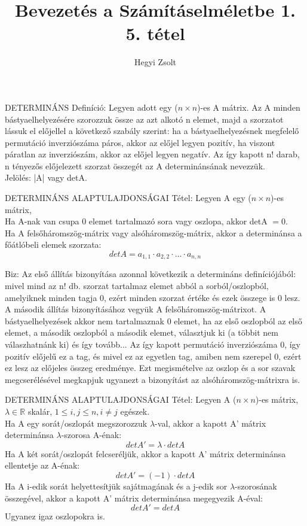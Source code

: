 \documentclass[]{article}
\title{Bevezetés a Számításelméletbe 1.\\{\large 5. tétel}}
\author{Hegyi Zsolt}
\newcommand{\R}{\mathbb{R}}
\begin{document}
\maketitle{}
\begin{shaded}
DETERMINÁNS Definíció: Legyen adott egy ($n \times n$)-es A mátrix. Az A minden bástyaelhelyezésére
szorozzuk össze az azt alkotó n elemet, majd a szorzatot lássuk el előjellel
a következő szabály szerint: ha a bástyaelhelyezésnek megfelelő permutáció inverziószáma
páros, akkor az előjel legyen pozitív, ha viszont páratlan az inverziószám,
akkor az előjel legyen negatív. Az így kapott n! darab, n tényezős előjelezett szorzat
összegét az A determinánsának nevezzük. \\
Jelölés: |A| vagy detA.
\end{shaded}
\begin{framed}
DETERMINÁNS ALAPTULAJDONSÁGAI Tétel: Legyen A egy ($n \times n$)-es mátrix,\\
Ha A-nak van csupa 0 elemet tartalmazó sora vagy oszlopa, akkor detA $= 0$.\\
Ha A felsőháromszög-mátrix vagy alsóháromszög-mátrix, akkor a determinánsa a főátlóbeli elemek szorzata: $$det A = a_{1,1}\cdot a_{2,2}\cdot \ldots\cdot a_{n,n}$$
\end{framed}
\begin{leftbar}
Biz: Az első állítás bizonyítása azonnal következik a determináns definíciójából: mivel mind az n! db. szorzat tartalmaz elemet abból a sorból/oszlopból, amelyiknek minden tagja 0, ezért minden szorzat értéke és ezek összege is 0 lesz.\\
A második állítás bizonyításához vegyük A felsőháromszög-mátrixot. A bástyaelhelyezések akkor nem tartalmaznak 0 elemet, ha az első oszlopból az első elemet, a második oszlopból a második elemet, választjuk ki (a többit nem válaszhatnánk ki) és így tovább... Az így kapott permutáció inverziószáma 0, így pozitív előjelű ez a tag, és mivel ez az egyetlen tag, amiben nem szerepel 0, ezért ez lesz az előjeles összeg eredménye. Ezt megismételve az oszlop és a sor szavak megcserélésével megkapjuk ugyanezt a bizonyítást az alsóháromszög-mátrixra is.
\end{leftbar}
\begin{framed}
DETERMINÁNS ALAPTULAJDONSÁGAI Tétel: Legyen A ($n\times n$)-es mátrix, $\lambda \in \R$ skalár, $1 \leq i,j\leq n, i \neq j$ egészek.\\
Ha A egy sorát/oszlopát megszorozzuk $\lambda$-val, akkor a kapott A' mátrix determinánsa $\lambda$-szorosa A-énak:$$detA' = \lambda\cdot detA$$
Ha A két sorát/oszlopát felcseréljük, akkor a kapott A' mátrix determinánsa ellentetje az A-énak:
$$detA' = (-1)\cdot detA$$
Ha A i-edik sorát helyettesítjük sajátmagának és a j-edik sor $\lambda$-szorosának összegével, akkor a kapott A' mátrix determinánsa megegyezik A-éval:
$$detA' = detA$$ Ugyanez igaz oszlopokra is.
\end{framed}
\end{document}
